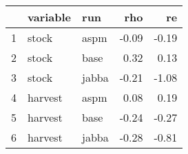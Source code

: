 \begin{table}[ht]
\centering
\begin{tabular}{rllrr}
  \hline
 & variable & run & rho & re \\ 
  \hline
1 & stock & aspm & -0.09 & -0.19 \\ 
  2 & stock & base & 0.32 & 0.13 \\ 
  3 & stock & jabba & -0.21 & -1.08 \\ 
  4 & harvest & aspm & 0.08 & 0.19 \\ 
  5 & harvest & base & -0.24 & -0.27 \\ 
  6 & harvest & jabba & -0.28 & -0.81 \\ 
   \hline
\end{tabular}
\end{table}
